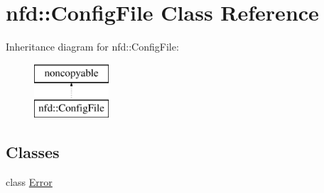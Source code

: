 \hypertarget{classnfd_1_1ConfigFile}{}\section{nfd\+:\+:Config\+File Class Reference}
\label{classnfd_1_1ConfigFile}
Inheritance diagram for nfd\+:\+:Config\+File\+:\begin{figure}[H]
\begin{center}
\leavevmode
\includegraphics[height=2.000000cm]{classnfd_1_1ConfigFile}
\end{center}
\end{figure}
\subsection*{Classes}
\begin{DoxyCompactItemize}
\item 
class \hyperlink{classnfd_1_1ConfigFile_1_1Error}{Error}
\end{DoxyCompactItemize}

